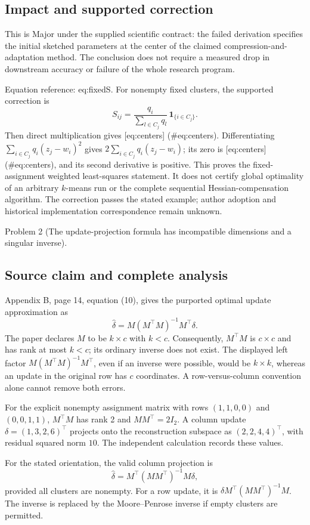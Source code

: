 \documentclass[10pt]{article}
\begin{document}
\subsection*{Impact and supported correction}
This is Major under the supplied scientific contract: the failed derivation specifies the initial sketched parameters at the center of the claimed compression-and-adaptation method. The conclusion does not require a measured drop in downstream accuracy or failure of the whole research program.\par
Equation reference: eq:fixedS. For nonempty fixed clusters, the supported correction is \[
 S_{ij}=\frac{q_i}{\sum_{l\in C_j}q_l}\,\mathbf1_{\{i\in C_j\}}.\] Then direct multiplication gives [eq:centers] (\#eq:centers). Differentiating \(\sum_{i\in C_j}q_i(z_j-w_i)^2\) gives \(2\sum_{i\in C_j}q_i(z_j-w_i)\); its zero is [eq:centers] (\#eq:centers), and its second derivative is positive. This proves the fixed-assignment weighted least-squares statement. It does not certify global optimality of an arbitrary \(k\)-means run or the complete sequential Hessian-compensation algorithm. The correction passes the stated example; author adoption and historical implementation correspondence remain unknown.\par
Problem 2 (The update-projection formula has incompatible dimensions and a singular inverse).\par
\subsection*{Source claim and complete analysis}
Appendix B, page 14, equation (10), gives the purported optimal update approximation as \[\widehat\delta=M(M^\top M)^{-1}M^\top\delta .\] The paper declares \(M\) to be \(k\times c\) with \(k<c\). Consequently, \(M^\top M\) is \(c\times c\) and has rank at most \(k<c\); its ordinary inverse does not exist. The displayed left factor \(M(M^\top M)^{-1}M^\top\), even if an inverse were possible, would be \(k\times k\), whereas an update in the original row has \(c\) coordinates. A row-versus-column convention alone cannot remove both errors.\par
For the explicit nonempty assignment matrix with rows \((1,1,0,0)\) and \((0,0,1,1)\), \(M^\top M\) has rank 2 and \(MM^\top=2I_2\). A column update \(\delta=(1,3,2,6)^\top\) projects onto the reconstruction subspace as \((2,2,4,4)^\top\), with residual squared norm \(10\). The independent calculation records these values.\par
For the stated orientation, the valid column projection is \[\widehat\delta=M^\top(MM^\top)^{-1}M\delta,\] provided all clusters are nonempty. For a row update, it is \(\delta M^\top(MM^\top)^{-1}M\). The inverse is replaced by the Moore–Penrose inverse if empty clusters are permitted.\par
\end{document}
